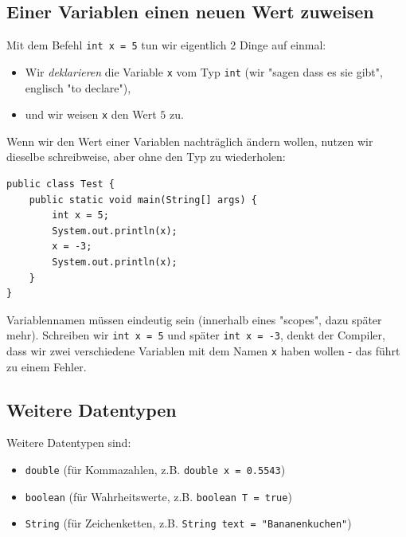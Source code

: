 \documentclass[ngerman,11pt]{article}
\begin{document}
    \vspace{0.5cm}
    \subsection{Einer Variablen einen neuen Wert zuweisen}

    Mit dem Befehl \lstinline{int x = 5} tun wir eigentlich 2 Dinge auf einmal:

    \begin{itemize}
        \item Wir \textit{deklarieren} die Variable \lstinline{x} vom Typ \lstinline{int}
        (wir "sagen dass es sie gibt", englisch "to declare"),
        \item und wir weisen \lstinline{x} den Wert $5$ zu.
    \end{itemize}

    Wenn wir den Wert einer Variablen nachträglich ändern wollen, nutzen wir dieselbe
    schreibweise, aber ohne den Typ zu wiederholen:

    \begin{lstlisting}[caption=Wert einer Variablen ändern]
public class Test {
    public static void main(String[] args) {
        int x = 5;
        System.out.println(x);
        x = -3;
        System.out.println(x);
    }
}
    \end{lstlisting}

    Variablennamen müssen eindeutig sein (innerhalb eines "scopes", dazu später mehr).
    Schreiben wir \lstinline{int x = 5} und später \lstinline{int x = -3}, denkt der Compiler,
    dass wir zwei verschiedene Variablen mit dem Namen \lstinline{x} haben wollen - das führt zu einem Fehler.

    \subsection{Weitere Datentypen}

    Weitere Datentypen sind:
    \begin{itemize}
        \item \lstinline{double} (für Kommazahlen, z.B. \lstinline{double x = 0.5543})
        \item \lstinline{boolean} (für Wahrheitswerte, z.B. \lstinline{boolean T = true})
        \item \lstinline{String} (für Zeichenketten, z.B. \lstinline{String text = "Bananenkuchen"})
    \end{itemize}
\end{document}
